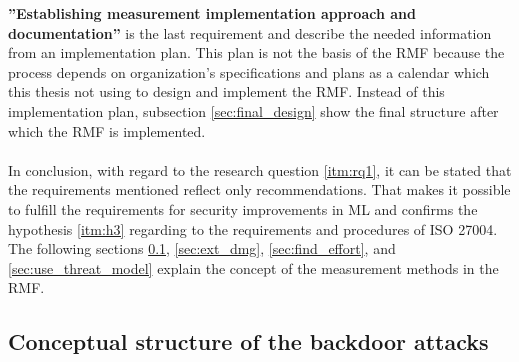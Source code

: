 \textbf{''Establishing measurement implementation approach and documentation''} is the last requirement and describe the needed information from an implementation plan. This plan is not the basis of the RMF because the process depends on organization's specifications and plans as a calendar which this thesis not using to design and implement the RMF. Instead of this implementation plan, subsection \ref{sec:final_design} show the final structure after which the RMF is implemented. \\ \\

In conclusion, with regard to the research question \ref{itm:rq1}, it can be stated that the requirements mentioned reflect only recommendations. That makes it possible to fulfill the requirements for security improvements in ML and confirms the hypothesis \ref{itm:h3} regarding to the requirements and procedures of ISO 27004. The following sections \ref{sec:charac_backdoor}, \ref{sec:ext_dmg}, \ref{sec:find_effort}, and \ref{sec:use_threat_model} explain the concept of the measurement methods in the RMF.

\subsection{Conceptual structure of the backdoor attacks}
\label{sec:charac_backdoor}


